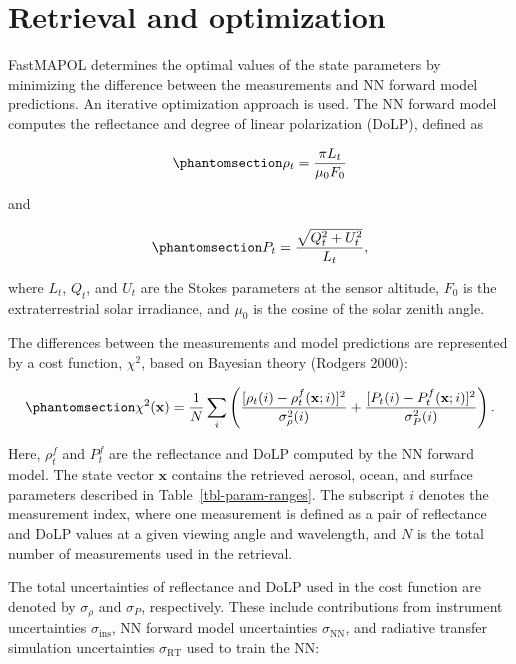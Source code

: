 \documentclass[
  letterpaper,
  open=any]{scrbook}
\begin{document}
\section{Retrieval and optimization}\label{retrieval-and-optimization}

FastMAPOL determines the optimal values of the state parameters by
minimizing the difference between the measurements and NN forward model
predictions. An iterative optimization approach is used. The NN forward
model computes the reflectance and degree of linear polarization (DoLP),
defined as

\begin{equation}\phantomsection\label{eq-rho}{
\rho_t
=
\frac{\pi L_t}{\mu_0 F_0}
}\end{equation}

and

\begin{equation}\phantomsection\label{eq-DoLP}{
P_t
=
\frac{\sqrt{Q_t^2+U_t^2}}{L_t},
}\end{equation}

where \(L_t\), \(Q_t\), and \(U_t\) are the Stokes parameters at the
sensor altitude, \(F_0\) is the extraterrestrial solar irradiance, and
\(\mu_0\) is the cosine of the solar zenith angle.

The differences between the measurements and model predictions are
represented by a cost function, \(\chi^2\), based on Bayesian theory
(Rodgers 2000):

\begin{equation}\phantomsection\label{eq-cost}{
\chi^2({\mathbf x})
=
\frac{1}{N}
\sum_i
\left(
\frac{[\rho_t(i)-\rho_t^f({\mathbf x};i)]^2}{\sigma_\rho^2(i)}
+
\frac{[P_t(i)-P_t^f({\mathbf x};i)]^2}{\sigma_P^2(i)}
\right).
}\end{equation}

Here, \(\rho_t^f\) and \(P_t^f\) are the reflectance and DoLP computed
by the NN forward model. The state vector \({\mathbf x}\) contains the
retrieved aerosol, ocean, and surface parameters described in
Table~\ref{tbl-param-ranges}. The subscript \(i\) denotes the
measurement index, where one measurement is defined as a pair of
reflectance and DoLP values at a given viewing angle and wavelength, and
\(N\) is the total number of measurements used in the retrieval.

The total uncertainties of reflectance and DoLP used in the cost
function are denoted by \(\sigma_\rho\) and \(\sigma_P\), respectively.
These include contributions from instrument uncertainties
\(\sigma_{\mathrm{ins}}\), NN forward model uncertainties
\(\sigma_{\mathrm{NN}}\), and radiative transfer simulation
uncertainties \(\sigma_{\mathrm{RT}}\) used to train the NN:
\end{document}

